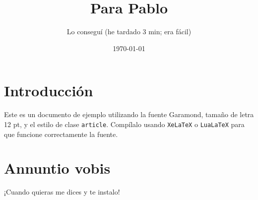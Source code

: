 \documentclass[12pt]{article}
\title{Para Pablo}
\author{Lo conseguí (he tardado 3 min; era fácil)}
\date{\today}
\begin{document}
\maketitle

\section{Introducción}

Este es un documento de ejemplo utilizando la fuente Garamond, tamaño de letra 12 pt, y el estilo de clase \texttt{article}. Compílalo usando \texttt{XeLaTeX} o \texttt{LuaLaTeX} para que funcione correctamente la fuente.

\section{Annuntio vobis}

¡Cuando quieras me dices y te instalo!
\end{document}
